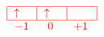\[
    \textcolor{red}{
        \begin{array}{c}
            \begin{tabular}{|m{0.5cm}|m{0.5cm}|m{0.5cm}|}
                \hline
                $\uparrow $ & $\uparrow $ &  \\
                \hline
            \end{tabular} \\ 
            \begin{tabular}{m{0.5cm} m{0.5cm} m{0.5cm}}
                $-1$ & \text{ 0 } & $+1$
            \end{tabular}
        \end{array}
    }
\]